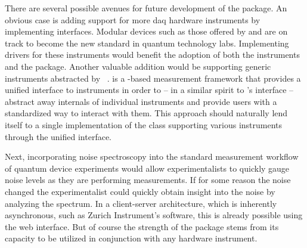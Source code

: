 There are several possible avenues for future development of the \pyspeck package.
An obvious case is adding support for more \gls{daq} hardware instruments by implementing  interfaces.
Modular devices such as those offered by  and  are on track to become the new standard in quantum technology labs.
Implementing drivers for these instruments would benefit the adoption of both the instruments and the \pyspeck package.
Another valuable addition would be supporting generic instruments abstracted by \qumada~\cite{Huckemann2026}.
\qumada is a \qcodes-based measurement framework that provides a unified interface to instruments in order to -- in a similar spirit to \pyspeck's  interface -- abstract away internals of individual instruments and provide users with a standardized way to interact with them.
This approach should naturally lend itself to a single implementation of the  class supporting various instruments through the unified \qumada interface.

Next, incorporating noise spectroscopy into the standard measurement workflow of quantum device experiments would allow experimentalists to quickly gauge noise levels as they are performing measurements.
If for some reason the noise changed
the experimentalist could quickly obtain insight into the noise by analyzing the spectrum.
In a client-server architecture, which is inherently asynchronous, such as Zurich Instrument's  software, this is already possible using the web interface.
But of course the strength of the \pyspeck package stems from its capacity to be utilized in conjunction with any hardware instrument.

